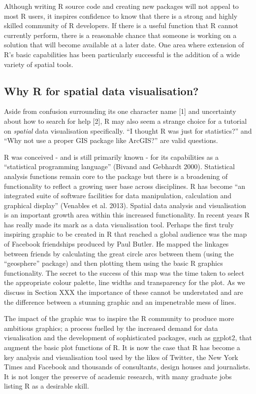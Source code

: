 \documentclass[]{article}
\begin{document}
Although writing R source code and creating new packages will not appeal
to most R users, it inspires confidence to know that there is a strong
and highly skilled community of R developers. If there is a useful
function that R cannot currently perform, there is a reasonable chance
that someone is working on a solution that will become available at a
later date. One area where extension of R's basic capabilities has been
particularly successful is the addition of a wide variety of spatial
tools.

\subsection{Why R for spatial data visualisation?}

Aside from confusion surrounding its one character name {[}1{]} and
uncertainty about how to search for help {[}2{]}, R may also seem a
strange choice for a tutorial on \emph{spatial} data visualisation
specifically. ``I thought R was just for statistics?'' and ``Why not use
a proper GIS package like ArcGIS?'' are valid questions.

R was conceived - and is still primarily known - for its capabilities as
a ``statistical programming language'' (Bivand and Gebhardt 2000).
Statistical analysis functions remain core to the package but there is a
broadening of functionality to reflect a growing user base across
disciplines. R has become ``an integrated suite of software facilities
for data manipulation, calculation and graphical display'' (Venables et
al. 2013). Spatial data analysis and visualisation is an important
growth area within this increased functionality. In recent years R has
really made its mark as a data visualisation tool. Perhaps the first
truly inspiring graphic to be created in R that reached a global
audience was the map of Facebook friendships produced by Paul Butler. He
mapped the linkages between friends by calculating the great circle arcs
between them (using the ``geosphere'' package) and then plotting them
using the basic R graphics functionality. The secret to the success of
this map was the time taken to select the appropriate colour palette,
line widths and transparency for the plot. As we discuss in Section XXX
the importance of these cannot be understated and are the difference
between a stunning graphic and an impenetrable mess of lines.

The impact of the graphic was to inspire the R community to produce more
ambitious graphics; a process fuelled by the increased demand for data
visualisation and the development of sophisticated packages, such as
ggplot2, that augment the basic plot functions of R. It is now the case
that R has become a key analysis and visualisation tool used by the
likes of Twitter, the New York Times and Facebook and thousands of
consultants, design houses and journalists. It is not longer the
preserve of academic research, with many graduate jobs listing R as a
desirable skill.
\end{document}
